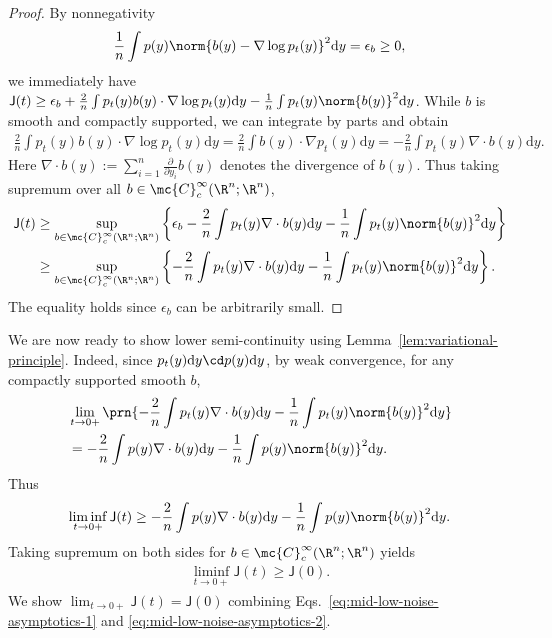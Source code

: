 \documentclass[11pt]{article}
\newcommand{\de}{\mathrm{d}}
\newcommand{\jfunc}{\mathsf{J}}
\begin{document}
\begin{proof}
    By nonnegativity
    \begin{align*}
        \frac{1}{n}\int p(y)\norm{b(y) - \nabla \log p_t(y)}^2 \de y = \epsilon_b \geq 0,
    \end{align*}
    we immediately have $\jfunc(t) \geq \epsilon_b + \frac{2}{n} \int p_t(y) b(y) \cdot \nabla \log p_t(y) \de y - \frac{1}{n}\int p_t(y) \norm{b(y)}^2 \de y$. While $b$ is smooth and compactly supported, we can integrate by parts and obtain
    \begin{align*}
        \frac{2}{n} \int p_t(y) b(y) \cdot \nabla \log p_t(y) \de y = \frac{2}{n}  \int b(y) \cdot \nabla p_t(y) \de y = -  \frac{2}{n}  \int p_t(y) \nabla \cdot b(y) \de y.
    \end{align*}
    Here $\nabla \cdot b(y) := \sum_{i=1}^n \frac{\partial}{\partial y_i} b(y)$ denotes the divergence of $b(y)$. Thus taking supremum over all $b \in \mc{C}_c^{\infty}(\R^n; \R^n)$,
    \begin{align*}
        \jfunc(t) & \geq \sup _{b \in \mc{C}_c^{\infty}(\R^n; \R^n)}\left\{ \epsilon_b - \frac{2}{n} \int p_t(y) \nabla \cdot b(y) \de y- \frac{1}{n}\int p_t(y) \norm{b(y)}^2 \de y \right\} \\
        & \geq \sup _{b \in \mc{C}_c^{\infty}(\R^n; \R^n)}\left\{- \frac{2}{n} \int p_t(y) \nabla \cdot b(y) \de y- \frac{1}{n}\int p_t(y) \norm{b(y)}^2 \de y\right\}.
    \end{align*}
    The equality holds since $\epsilon_b$ can be arbitrarily small.
\end{proof}

We are now ready to show lower semi-continuity using Lemma~\ref{lem:variational-principle}. Indeed, since $p_t(y) \de y \cd p(y) \de y$, by weak convergence, for any compactly supported smooth $b$,
\begin{align*}
    &\lim_{t \to 0+} \prn{- \frac{2}{n} \int p_t(y) \nabla \cdot b(y) \de y- \frac{1}{n}\int p_t(y) \norm{b(y)}^2 \de y} \nonumber \\
    &= - \frac{2}{n} \int p(y) \nabla \cdot b(y) \de y- \frac{1}{n}\int p(y) \norm{b(y)}^2 \de y.
\end{align*}
Thus
\begin{align*}
    \liminf_{t \to 0+} \jfunc(t) \geq - \frac{2}{n} \int p(y) \nabla \cdot b(y) \de y- \frac{1}{n}\int p(y) \norm{b(y)}^2 \de y.
\end{align*}
Taking supremum on both sides for $b \in \mc{C}_c^{\infty}(\R^n; \R^n)$ yields
\begin{align} \label{eq:mid-low-noise-asymptotics-2}
    \liminf_{t \to 0+} \jfunc(t) \geq \jfunc(0).
\end{align}
We show $\lim_{t \to 0+} \jfunc(t) = \jfunc(0)$ combining Eqs.~\eqref{eq:mid-low-noise-asymptotics-1} and \eqref{eq:mid-low-noise-asymptotics-2}.
\end{document}

